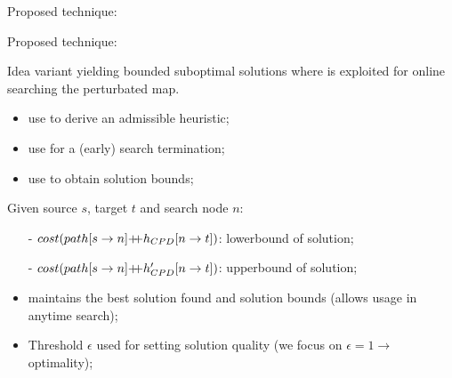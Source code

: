 \begin{frame}{Proposed technique: \CPDSearch{}}
\begin{minipage}{0.35\textwidth}
    \end{minipage}

\end{frame}

\begin{frame}{Proposed technique: \CPDSearch{}}
    \begin{block}{Idea}
        \A{} variant yielding bounded suboptimal solutions where \CPDPath{} is exploited for online searching the perturbated map.
    \end{block}

    \begin{itemize}
        \item {\color{gray}use \CPD{} to derive an admissible heuristic;}
        \item {\color{gray}use \CPD{} for a (early) search termination;}
        \item {use \CPD{} to obtain solution bounds;}
    \end{itemize}

    Given source $s$, target $t$ and search node $n$: 
    \begin{itemize}
        \item[-] $cost(path[s \rightarrow n] \doublePlus{} \CPDPath{}[n \rightarrow t])$: lowerbound of solution;
        \item[-] $cost(path[s \rightarrow n] \doublePlus{} \CPDPathNew{}[n \rightarrow t])$: upperbound of solution;
    \end{itemize}

    \begin{block}{}
        \begin{itemize}
            \item \CPDSearch{} maintains the best solution found and solution bounds (allows usage in anytime search);
            \item Threshold $\epsilon$ used for setting \CPDSearch{} solution quality (we focus on $\epsilon = 1 \rightarrow $ optimality);
        \end{itemize}
    \end{block}

\end{frame}


